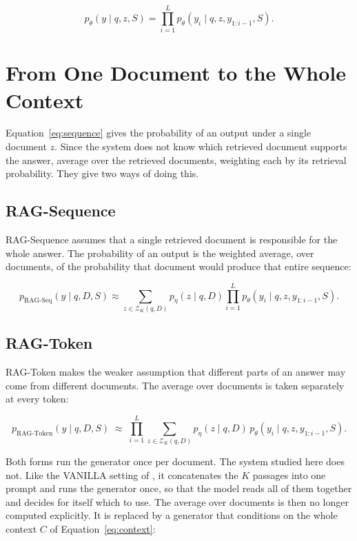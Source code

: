 \documentclass[12pt,a4paper,oneside]{scrreprt}
\begin{document}
\begin{equation}
\label{eq:sequence}
p_\theta(y \mid q,z,S) = \prod_{i=1}^{L} p_\theta(y_i \mid q,z,y_{1:i-1},S).
\end{equation}

\section{From One Document to the Whole Context}
\label{sec:ragdist}

Equation~\eqref{eq:sequence} gives the probability of an output under a single document $z$. Since the system does not know which retrieved document supports the answer, \citet{lewis2020rag} average over the retrieved documents, weighting each by its retrieval probability. They give two ways of doing this.

\subsection{RAG-Sequence}

RAG-Sequence assumes that a single retrieved document is responsible for the whole answer. The probability of an output is the weighted average, over documents, of the probability that document would produce that entire sequence:

\begin{equation}
\label{eq:ragseq}
p_{\text{RAG-Seq}}(y \mid q,D,S) \approx \sum_{z \in \mathcal{Z}_K(q,D)} p_\eta(z \mid q,D) \prod_{i=1}^{L} p_\theta(y_i \mid q,z,y_{1:i-1},S).
\end{equation}

\subsection{RAG-Token}

RAG-Token makes the weaker assumption that different parts of an answer may come from different documents. The average over documents is taken separately at every token:

\begin{equation}
\label{eq:ragtok}
p_{\text{RAG-Token}}(y \mid q,D,S) \;\approx\; \prod_{i=1}^{L} \sum_{z \in \mathcal{Z}_K(q,D)} p_\eta(z \mid q,D) \, p_\theta(y_i \mid q,z,y_{1:i-1},S).
\end{equation}

Both forms run the generator once per document. The system studied here does not. Like the VANILLA setting of \citet{gao2023alce}, it concatenates the $K$ passages into one prompt and runs the generator once, so that the model reads all of them together and decides for itself which to use. The average over documents is then no longer computed explicitly. It is replaced by a generator that conditions on the whole context $C$ of Equation~\eqref{eq:context}:
\end{document}
